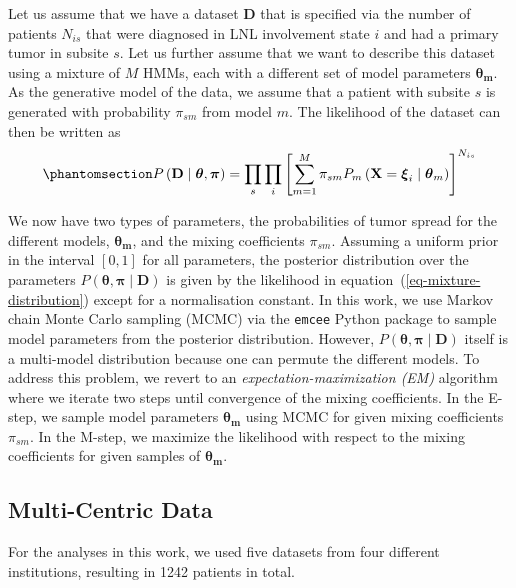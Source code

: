\documentclass[11pt,twocolumn,twoside]{article}
\begin{document}
Let us assume that we have a dataset \(\mathbf{D}\) that is specified
via the number of patients \(N_{is}\) that were diagnosed in LNL
involvement state \(i\) and had a primary tumor in subsite \(s\). Let us
further assume that we want to describe this dataset using a mixture of
\(M\) HMMs, each with a different set of model parameters
\(\boldsymbol{\theta_m}\). As the generative model of the data, we
assume that a patient with subsite \(s\) is generated with probability
\(\pi_{sm}\) from model \(m\). The likelihood of the dataset can then be
written as
\begin{equation}\phantomsection\label{eq-mixture-distribution}{
P \left( \mathbf{D} \mid \boldsymbol{\theta}, \boldsymbol{\pi}\right) = \prod_s \prod_i \left[ \sum_{m=1}^M \pi_{sm} P_m \left( \mathbf{X}=\boldsymbol{\xi}_i \mid \boldsymbol{\theta}_m \right) \right]^{N_{is}}
}\end{equation}

We now have two types of parameters, the probabilities of tumor spread
for the different models, \(\boldsymbol{\theta_m}\), and the mixing
coefficients \(\pi_{sm}\). Assuming a uniform prior in the interval
\([0,1]\) for all parameters, the posterior distribution over the
parameters
\(P \left( \boldsymbol{\theta}, \boldsymbol{\pi} \mid \mathbf{D} \right)\)
is given by the likelihood in equation~(\ref{eq-mixture-distribution}) except
for a normalisation constant. In this work, we use Markov chain Monte
Carlo sampling (MCMC) via the \texttt{emcee} Python package
\autocite{foreman-mackey_emcee_2013} to sample model parameters from the
posterior distribution. However,
\(P \left( \boldsymbol{\theta}, \boldsymbol{\pi} \mid \mathbf{D} \right)\)
itself is a multi-model distribution because one can permute the
different models. To address this problem, we revert to an
\emph{expectation-maximization (EM)} algorithm where we iterate two steps until convergence of the mixing coefficients. In the E-step, we sample model parameters \(\boldsymbol{\theta_m}\) using MCMC for given mixing coefficients \(\pi_{sm}\). In the M-step, we maximize the likelihood with respect to the mixing coefficients for given samples of \(\boldsymbol{\theta_m}\).

\subsection{Multi-Centric Data}\label{multi-centric-data}

For the analyses in this work, we used five datasets from four different institutions, resulting in 1242 patients in total.
\end{document}
